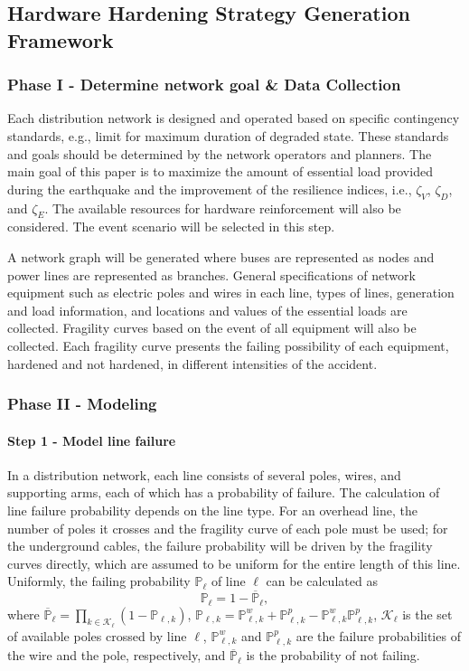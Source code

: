 \documentclass[conference]{IEEEtran}
\begin{document}
\subsection{Hardware Hardening Strategy Generation Framework}
\subsubsection{Phase I - Determine network goal \& Data Collection}\label{p1s1}
Each distribution network is designed and operated based on specific contingency standards, e.g., limit for maximum duration of degraded state. These standards and goals should be determined by the network operators and planners. The main goal of this paper is to maximize the amount of essential load provided during the earthquake and the improvement of the resilience indices, i.e., $\zeta_V$, $\zeta_D$, and $\zeta_E$. The available resources for hardware reinforcement will also be considered. The event scenario will be selected in this step.

A network graph will be generated where buses are represented as nodes and power lines are represented as branches. General specifications of network equipment such as electric poles and wires in each line, types of lines, generation and load information, and locations and values of the essential loads are collected. Fragility curves based on the event of all equipment will also be collected. Each fragility curve presents the failing possibility of each equipment, hardened and not hardened, in different intensities of the accident.
\subsubsection{Phase II - Modeling}
\paragraph{Step 1 - Model line failure}\label{p2s1}
 In a distribution network, each line consists of several poles, wires, and supporting arms, each of which has a probability of failure. The calculation of line failure probability depends on the line type. For an overhead line, the number of poles it crosses and the fragility curve of each pole must be used; for the underground cables, the failure probability will be driven by the fragility curves directly, which are assumed to be uniform for the entire length of this line. Uniformly,  the failing probability $\mathbb{P}_{\ell}$ of line $\ell$ can be calculated as
\begin{equation}\label{totall prob}
    \mathbb{P}_{\ell}=1-\overline{\mathbb{P}}_{\ell},
\end{equation}
where $\overline{\mathbb{P}}_{\ell}=\prod_{k\in \mathcal{K}_{\ell}}(1-\mathbb{P}_{\ell,k})$, $\mathbb{P}_{\ell,k}=\mathbb{P}_{\ell,k}^{w}+\mathbb{P}_{\ell,k}^{p}-\mathbb{P}_{\ell,k}^{w}\mathbb{P}_{\ell,k}^{p}$, $\mathcal{K}_{\ell}$ is the set of available poles crossed by line $\ell$, $\mathbb{P}_{\ell,k}^{w}$ and $\mathbb{P}_{\ell,k}^{p}$ are the failure probabilities of the wire and the pole, respectively, and ${\overline{\mathbb{P}}}_{\ell}$ is the probability of not failing.
\end{document}
